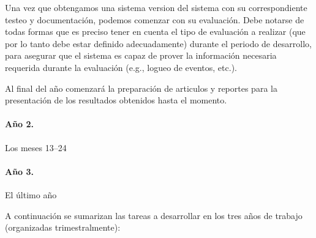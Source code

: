 Una vez que obtengamos una sistema version del sistema con su
correspondiente testeo y documentaci\'on, podemos comenzar con
su evaluaci\'on.  Debe notarse de todas formas que es preciso tener en cuenta
el tipo de evaluaci\'on a realizar (que por lo tanto debe estar definido
adecuadamente) durante el periodo de desarrollo, para asegurar que el sistema
es capaz de prover la informaci\'on necesaria requerida durante la evaluaci\'on
(e.g., logueo de eventos, etc.).

Al final del a\~no comenzar\'a la preparaci\'on de articulos y reportes para
la presentaci\'on de los resultados obtenidos hasta el momento.

\paragraph{A\~no 2.} Los meses 13--24

\paragraph{A\~no 3.} El \'ultimo a\~no

\medskip

\noindent
A continuaci\'on se sumarizan las tareas a desarrollar en los tres a\~nos de trabajo (organizadas trimestralmente):

